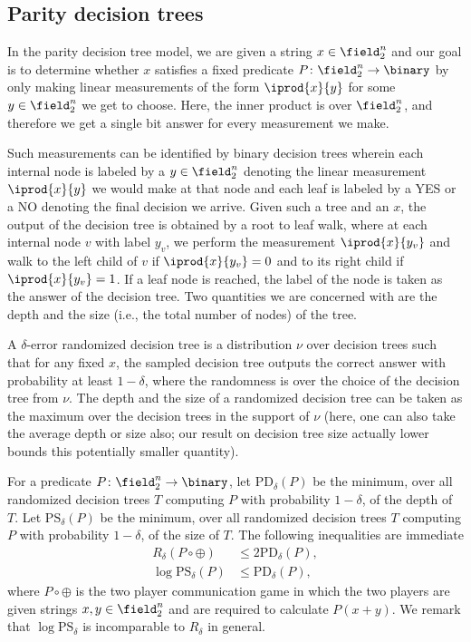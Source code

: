 \subsection{Parity decision trees}
\def\PD{\mathrm{PD}}
\def\PS{\mathrm{PS}}
In the parity decision tree model, we are given a string 
$x\in\field_2^n$ and our goal is to determine whether 
$x$ satisfies a fixed predicate
$P\colon\field_2^n\to\binary$ by only making linear 
measurements of the form $\iprod{x}{y}$ for some 
$y\in \field_2^n$ we get to choose. Here, the inner product
is over $\field_2^n$, and therefore we get a single bit 
answer for every measurement we make.

Such measurements can be identified by binary decision
trees wherein each internal node is labeled by a
$y\in\field_2^n$ denoting the linear measurement
$\iprod{x}{y}$ we would make at that node and each leaf
is labeled by a YES or a NO denoting the final decision we 
arrive. Given such a tree and an $x$, the output of the 
decision tree is obtained by a root to leaf walk, where at 
each internal node $v$ with label $y_v$, 
we perform the measurement 
$\iprod{x}{y_v}$ and walk to the left child of $v$ if 
$\iprod{x}{y_v}=0$ and to its right child if 
$\iprod{x}{y_v}=1$. If a leaf node is reached, 
the label of the node is taken as the answer of 
the decision tree. Two quantities we are concerned with
are the depth and the size (i.e., the total number of nodes)
of the tree.

A $\delta$-error randomized decision tree is a distribution
$\nu$ over decision trees such that for any fixed $x$, 
the sampled decision tree outputs the correct answer with 
probability at least $1-\delta$, where the randomness is over 
the choice of the decision tree from $\nu$. 
The depth and the size of a randomized decision tree can be 
taken as the maximum over the decision trees in the support 
of $\nu$ (here, one can also take the average depth or size also;
our result on decision tree size actually lower bounds this 
potentially smaller quantity).

For a predicate $P\colon\field_2^n\to\binary$, let 
$\PD_\delta(P)$ be the minimum, over all randomized decision 
trees $T$ computing $P$ with probability $1-\delta$, of the 
depth of $T$.
Let $\PS_\delta(P)$ be the minimum, over all randomized decision 
trees $T$ computing $P$ with probability $1-\delta$, of the 
size of $T$. The following inequalities are immediate
\begin{align}
  R_\delta(P\circ\oplus)&\le 2\PD_\delta(P)\label{eq:rvspd},\\
  \log\PS_\delta(P)&\le \PD_\delta(P)\nonumber,
\end{align}
where $P\circ \oplus$ is the two player communication game 
in which the two players are given strings $x,y\in\field_2^n$ 
and are required to calculate $P(x+y)$. 
We remark that $\log \PS_\delta$ is incomparable to $R_\delta$ 
in general.

